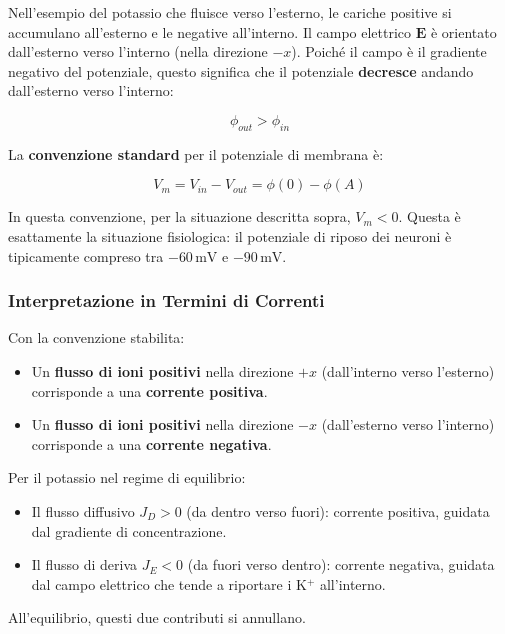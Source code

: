 Nell'esempio del potassio che fluisce verso l'esterno, le cariche positive si accumulano all'esterno e le negative all'interno. Il campo elettrico $\mathbf{E}$ è orientato dall'esterno verso l'interno (nella direzione $-x$). Poiché il campo è il gradiente negativo del potenziale, questo significa che il potenziale \textbf{decresce} andando dall'esterno verso l'interno:

\begin{equation}
\phi_{out} > \phi_{in}
\end{equation}

La \textbf{convenzione standard} per il potenziale di membrana è:

\begin{equation}
\boxed{V_m = V_{in} - V_{out} = \phi(0) - \phi(A)}
\end{equation}

In questa convenzione, per la situazione descritta sopra, $V_m < 0$. Questa è esattamente la situazione fisiologica: il potenziale di riposo dei neuroni è tipicamente compreso tra $-60\,\text{mV}$ e $-90\,\text{mV}$.

\subsubsection{Interpretazione in Termini di Correnti}

Con la convenzione stabilita:

\begin{itemize}
    \item Un \textbf{flusso di ioni positivi} nella direzione $+x$ (dall'interno verso l'esterno) corrisponde a una \textbf{corrente positiva}.
    \item Un \textbf{flusso di ioni positivi} nella direzione $-x$ (dall'esterno verso l'interno) corrisponde a una \textbf{corrente negativa}.
\end{itemize}

Per il potassio nel regime di equilibrio:
\begin{itemize}
    \item Il flusso diffusivo $J_D > 0$ (da dentro verso fuori): corrente positiva, guidata dal gradiente di concentrazione.
    \item Il flusso di deriva $J_E < 0$ (da fuori verso dentro): corrente negativa, guidata dal campo elettrico che tende a riportare i K$^+$ all'interno.
\end{itemize}

All'equilibrio, questi due contributi si annullano.

